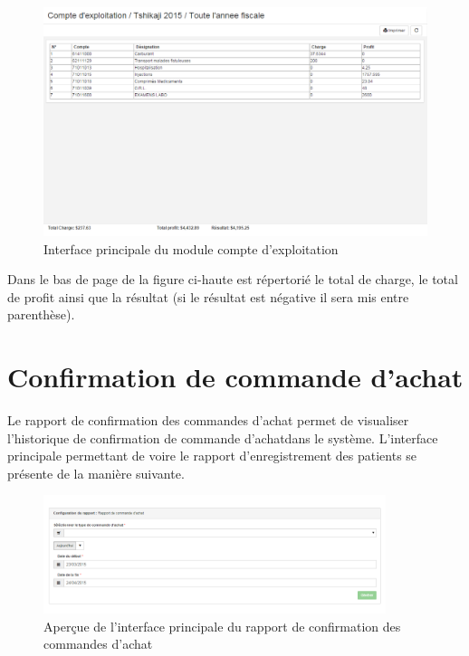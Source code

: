 \documentclass[12pt,a4paper]{report}
\begin{document}
\begin{figure}[h]
\begin{center}
\includegraphics[width=12cm]{pic/ComptExploitaApp.png}
\end{center}
\caption{Interface principale du module compte d'exploitation}
\label{Interface principale du module compte d'exploitation}
\end{figure}

Dans le bas de page de la figure ci-haute est répertorié le total de charge, le total de profit ainsi que la résultat (si le résultat est négative il sera mis entre parenthèse).

\newpage
\section{Confirmation de commande d'achat}
Le rapport de confirmation des commandes d'achat permet de visualiser l'historique de confirmation de commande d'achatdans le système. L'interface principale permettant de voire le rapport d'enregistrement des patients se présente de la manière suivante. 

\begin{figure}[h]
\begin{center}
\includegraphics[width=10cm]{pic/RapConfPO.png}
\end{center}
\caption{Aperçue de l'interface principale du rapport de confirmation des commandes d'achat}
\label{Aperçue de l'interface principale du rapport de confirmation des commandes d'achat}
\end{figure}
\end{document}
